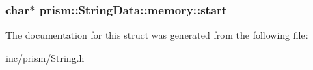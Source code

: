 \subsubsection[{\texorpdfstring{start}{start}}]{\setlength{\rightskip}{0pt plus 5cm}char$\ast$ prism\+::\+String\+Data\+::memory\+::start}\hypertarget{structprism_1_1_string_data_1_1memory_acb8564230189b60e891a5f86de755507}{}\label{structprism_1_1_string_data_1_1memory_acb8564230189b60e891a5f86de755507}


The documentation for this struct was generated from the following file\+:\begin{DoxyCompactItemize}
\item 
inc/prism/\hyperlink{_string_8h}{String.\+h}\end{DoxyCompactItemize}
